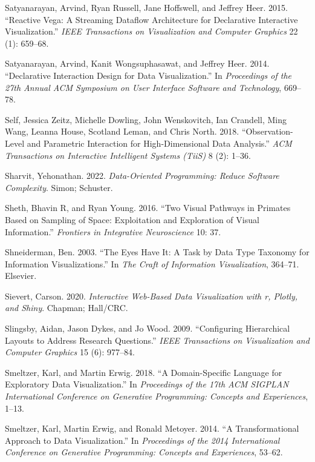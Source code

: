 \documentclass[
]{book}
\newlength{\cslhangindent}
\newenvironment{CSLReferences}[2] %
 {\begin{list}{}{%
  \setlength{\itemindent}{0pt}
  \setlength{\leftmargin}{0pt}
  \setlength{\parsep}{0pt}
  \ifodd #1
   \setlength{\leftmargin}{\cslhangindent}
   \setlength{\itemindent}{-1\cslhangindent}
  \fi
  \setlength{\itemsep}{#2\baselineskip}}}
 {\end{list}}
\theoremstyle{definition}
\theoremstyle{definition}
\theoremstyle{definition}
\theoremstyle{definition}
\theoremstyle{remark}
\begin{document}
\begin{CSLReferences}{1}{0}
Satyanarayan, Arvind, Ryan Russell, Jane Hoffswell, and Jeffrey Heer. 2015. {``Reactive Vega: A Streaming Dataflow Architecture for Declarative Interactive Visualization.''} \emph{IEEE Transactions on Visualization and Computer Graphics} 22 (1): 659--68.

Satyanarayan, Arvind, Kanit Wongsuphasawat, and Jeffrey Heer. 2014. {``Declarative Interaction Design for Data Visualization.''} In \emph{Proceedings of the 27th Annual ACM Symposium on User Interface Software and Technology}, 669--78.

Self, Jessica Zeitz, Michelle Dowling, John Wenskovitch, Ian Crandell, Ming Wang, Leanna House, Scotland Leman, and Chris North. 2018. {``Observation-Level and Parametric Interaction for High-Dimensional Data Analysis.''} \emph{ACM Transactions on Interactive Intelligent Systems (TiiS)} 8 (2): 1--36.

Sharvit, Yehonathan. 2022. \emph{Data-Oriented Programming: Reduce Software Complexity}. Simon; Schuster.

Sheth, Bhavin R, and Ryan Young. 2016. {``Two Visual Pathways in Primates Based on Sampling of Space: Exploitation and Exploration of Visual Information.''} \emph{Frontiers in Integrative Neuroscience} 10: 37.

Shneiderman, Ben. 2003. {``The Eyes Have It: A Task by Data Type Taxonomy for Information Visualizations.''} In \emph{The Craft of Information Visualization}, 364--71. Elsevier.

Sievert, Carson. 2020. \emph{Interactive Web-Based Data Visualization with r, Plotly, and Shiny}. Chapman; Hall/CRC.

Slingsby, Aidan, Jason Dykes, and Jo Wood. 2009. {``Configuring Hierarchical Layouts to Address Research Questions.''} \emph{IEEE Transactions on Visualization and Computer Graphics} 15 (6): 977--84.

Smeltzer, Karl, and Martin Erwig. 2018. {``A Domain-Specific Language for Exploratory Data Visualization.''} In \emph{Proceedings of the 17th ACM SIGPLAN International Conference on Generative Programming: Concepts and Experiences}, 1--13.

Smeltzer, Karl, Martin Erwig, and Ronald Metoyer. 2014. {``A Transformational Approach to Data Visualization.''} In \emph{Proceedings of the 2014 International Conference on Generative Programming: Concepts and Experiences}, 53--62.


\end{CSLReferences}
\end{document}

